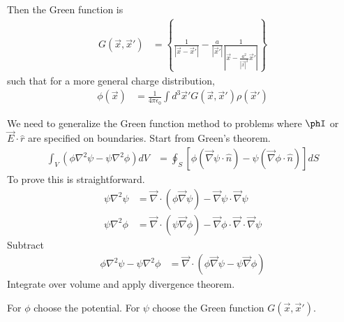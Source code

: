 Then the Green function is
\begin{align}
    G\left( \vec{x}, \vec{x}' \right)
    &=
    \left\{ 
    \frac{1}{\left|\vec{x} - \vec{x}'\right|}
    -
    \frac{a}{\left|\vec{x}'\right|}
    \frac{1}{\left|
    \vec{x}
    -
    \frac{a^2}{\left|\vec{x}\right|^2}
    \vec{x}'
    \right|}
    \right\}
\end{align}
such that for a more general charge distribution,
\begin{align}
    \phi(\vec{x})
    &=
    \frac{1}{4\pi\epsilon_0}
    \int d^3\vec{x}'
    G\left( \vec{x}, \vec{x}' \right)
    \rho\left(\vec{x}'\right)
\end{align}

We need to generalize the Green function method to problems where $\phI$ or
$\vec{E}\cdot\hat{r}$ are specified on boundaries.
Start from Green's theorem.
\begin{align}
    \int_V
    \left( 
    \phi \nabla^2 \psi
    - \psi \nabla^2 \phi
    \right)
    dV
    &=
    \oint_S
    \left[ 
    \phi\left( \vec{\nabla}\psi\cdot\hat{n} \right)
    - \psi\left( \vec{\nabla}\phi\cdot\hat{n} \right)
    \right]
    dS
\end{align}
To prove this is straightforward.
\begin{align}
    \psi\nabla^2 \psi &=
    \vec{\nabla}\cdot\left( 
    \phi\vec{\nabla}\psi
    \right)
    - \vec{\nabla}\psi
    \cdot \vec{\nabla} \psi\\
    \psi\nabla^2\phi
    &=
    \vec{\nabla}\cdot\left( 
    \psi\vec{\nabla}\phi
    \right)
    -
    \vec{\nabla}\phi
    \cdot\vec{\nabla}\cdot\vec{\nabla}\psi
\end{align}
Subtract
\begin{align}
    \phi\nabla^2\psi
    - \psi\nabla^2\phi
    &=
    \vec{\nabla}\cdot\left( 
    \phi\vec{\nabla}\psi
    -
    \psi\vec{\nabla}\phi
    \right)
\end{align}
Integrate over volume and apply divergence theorem.

For $\phi$ choose the potential.
For $\psi$ choose the Green function $G\left( \vec{x}, \vec{x}' \right)$.

